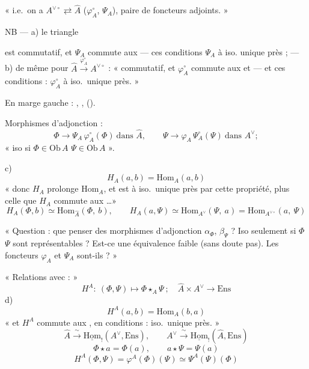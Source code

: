 \documentclass[11pt,a4paper]{article}
\begin{document}
« i.e.\ on a $A^{\vee\circ} \rightleftarrows \widehat{A}$
($\varphi_{A}^{\circ}$, $\Psi_{A}$), paire de foncteurs adjoints. »

NB — a) le triangle
est commutatif, et $\Psi_{A}$ commute aux  —
ces  conditions  $\Psi_{A}$ à iso.
unique près ; — b) de même pour
$\widehat{A} \xrightarrow{\varphi_{A}^{\circ}} A^{\vee\circ}$ :
« commutatif, et $\varphi_{A}^{\circ}$ commute aux \ill{} et \ill{} — et ces
conditions : $\varphi_{A}^{\circ}$ à iso.\ unique près. »

En marge gauche : ,
,
().

Morphismes d'adjonction :
\[
\Phi \longrightarrow \Psi_{A}\,\varphi_{A}^{\circ}(\Phi)
\ \text{dans } \widehat{A},
\qquad
\Psi \longrightarrow \varphi_{A}\,\Psi_{A}^{\circ}(\Psi)
\ \text{dans } A^{\vee} ;
\]
« iso si $\Phi \in \mathrm{Ob}\,A$  $\Psi \in \mathrm{Ob}\,A$ ».

c)
\[
\boxed{\ H_{A}(a,b) = \mathrm{Hom}_{A}(a,b)\ }
\]
« donc $H_{A}$ prolonge $\mathrm{Hom}_{A}$, et est  à
iso.\ unique près par cette propriété, plus celle que $H_{A}$ commute aux
 \ldots »
\[
H_{A}(\Phi, b) \simeq \mathrm{Hom}_{\widehat{A}}(\Phi,\ b),
\qquad
H_{A}(a, \Psi) \simeq \mathrm{Hom}_{A^{\vee}}(\Psi,\ a)
= \mathrm{Hom}_{A^{\vee\circ}}(a,\ \Psi)
\]

« Question : que penser des morphismes d'adjonction $\alpha_{\Phi}$,
$\beta_{\Psi}$ ? Iso  seulement si $\Phi$ 
$\Psi$ sont représentables ? Est-ce  une équivalence
faible (sans doute pas). Les foncteurs $\varphi_{A}$ et $\Psi_{A}$ sont-ils
\ill{} ? »

« Relations avec  : »
\[
\boxed{\ H^{A} :\ (\Phi,\Psi) \longmapsto \Phi \star_{A} \Psi\ ;\quad
\widehat{A} \times A^{\vee} \longrightarrow \mathrm{Ens}\ }
\]
d)
\[
\boxed{\ H^{A}(a,b) = \mathrm{Hom}_{A}(b,a)\ }
\]
« et $H^{A}$ commute aux , en 
conditions : iso.\ unique près. »
\[
\boxed{\ \widehat{A} \xrightarrow{\ \sim\ }
\underline{\mathrm{Hom}}_{!}(A^{\vee}, \mathrm{Ens}),
\qquad
A^{\vee} \xrightarrow{\ \sim\ }
\underline{\mathrm{Hom}}_{!}(\widehat{A}, \mathrm{Ens})\ }
\]
\[
\Phi \star a = \Phi(a), \qquad a \star \Psi = \Psi(a)
\]
\[
H^{A}(\Phi,\Psi) = \varphi^{A}(\Phi)(\Psi) \simeq \Psi^{A}(\Psi)(\Phi)
\]
\end{document}
